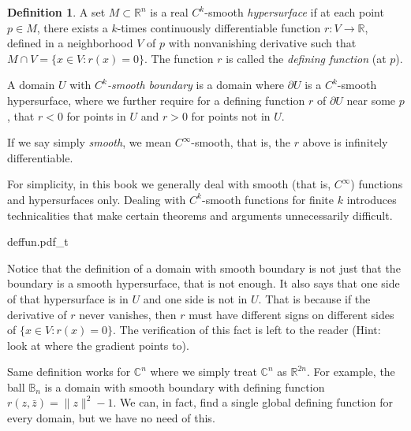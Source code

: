 \documentclass[12pt,openany]{book}
\newcommand{\snorm}[1]{\lVert {#1} \rVert}
\newcommand{\C}{{\mathbb{C}}}
\newcommand{\R}{{\mathbb{R}}}
\newcommand{\bB}{{\mathbb{B}}}
\newcommand{\myindex}[1]{#1\index{#1}}
\theoremstyle{plain}
\theoremstyle{remark}
\theoremstyle{definition}
\newtheorem{defn}[thm]{Definition}
\theoremstyle{exercise}
\theoremstyle{example}
\begin{document}
\begin{defn} \label{def:hypersurface}
A set $M \subset \R^n$ is a real
%
$C^k$-smooth \emph{\myindex{hypersurface}}%
if at each point
$p \in M$, there exists a $k$-times continuously
differentiable function $r \colon V \to
\R$, defined in a neighborhood $V$ of $p$ with nonvanishing derivative
such that $M \cap V = \bigl\{ x \in V : r(x) = 0 \bigr\}$.  The function $r$ is
called the \emph{\myindex{defining function}} (at $p$).

A domain $U$ with
\emph{$C^k$-smooth boundary}%
%
is a domain where
$\partial U$ is a $C^k$-smooth hypersurface, where we further require
for a defining function $r$ of $\partial U$ near some $p$,
that $r < 0$ for points in $U$ and $r > 0$
for points not in $U$.

If we say simply
\emph{smooth},
%
we mean $C^\infty$-smooth,
that is, the $r$ above is infinitely differentiable.
\end{defn}

For simplicity, in this book we generally deal with smooth
(that is, $C^\infty$) functions and hypersurfaces only.  Dealing with
$C^k$-smooth functions for finite $k$ introduces technicalities that make
certain theorems and arguments unnecessarily difficult.


\begin{center}
{deffun.pdf_t}
\end{center}


Notice that the definition of a domain with smooth boundary is not just that the
boundary is a smooth hypersurface, that is not enough.  It also says that 
one side of that hypersurface is in $U$ and one side is not in $U$.  That is
because if the derivative of $r$ never vanishes, then $r$ must have
different signs on different sides of $\{ x \in V : r(x) = 0 \}$.  The
verification of this fact is left to the reader (Hint: look at where the
gradient points to).

Same definition works for $\C^n$ where we simply treat $\C^n$ as $\R^{2n}$.
For example, the ball $\bB_n$ is a domain with smooth boundary with defining
function $r(z,\bar{z}) = \snorm{z}^2-1$.  We can, in fact, find a
single global defining function for every domain, but we have no need of this.
\end{document}
